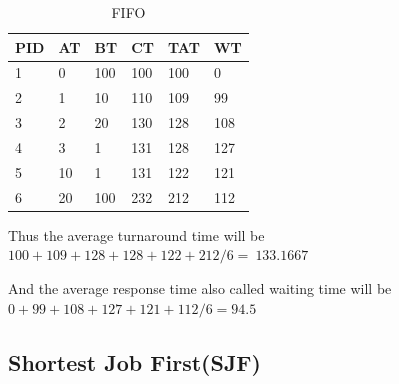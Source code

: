 \documentclass[11pt,a4paper]{article}
\theoremstyle{plain}
\theoremstyle{definition}
\theoremstyle{remark}
\numberwithin{equation}{section}
\begin{document}
\begin{table}[H]
	\centering
	\caption{FIFO}
	\label{t2-fifo}
	\begin{tabular}{llllll}
		\hline
		\multicolumn{1}{|l|}{PID} & \multicolumn{1}{l|}{AT} & \multicolumn{1}{l|}{BT} & \multicolumn{1}{l|}{CT} & \multicolumn{1}{l|}{TAT} & \multicolumn{1}{l|}{WT} \\ \hline
		1                         & 0                       & 100                     & 100                     & 100                      & 0                       \\
		2                         & 1                       & 10                      & 110                     & 109                      & 99                      \\
		3                         & 2                       & 20                      & 130                     & 128                      & 108                     \\
		4                         & 3                       & 1                       & 131                     & 128                      & 127                     \\
		5                         & 10                      & 1                       & 131                     & 122                      & 121                     \\
		6                         & 20                      & 100                     & 232                     & 212                      & 112                    
	\end{tabular}
\end{table}

Thus the average turnaround time will be $100+109+128+128+122+212/6=~133.1667$

And the average response time also called waiting time will be $0+99+108+127+121+112/6=94.5$

\subsection*{Shortest Job First(SJF)}
\end{document}
